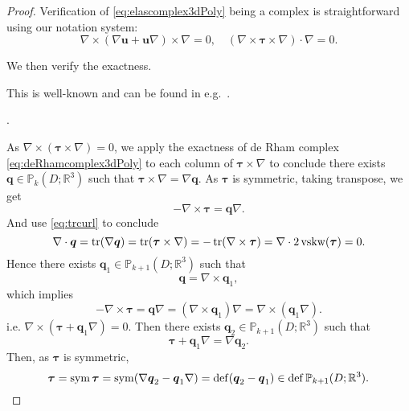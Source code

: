 \begin{proof}
Verification of \eqref{eq:elascomplex3dPoly} being a complex is straightforward using our notation system:
$$
\nabla \times (\nabla \boldsymbol  u + \boldsymbol  u\nabla)\times \nabla = 0, \quad (\nabla \times \boldsymbol  \tau\times \nabla)\cdot\nabla = 0.
$$


We then verify the exactness. 

\medskip
{} This is well-known and can be found in e.g.~\cite{Ciarlet:2010inequality}. 

\medskip

. 

As $\nabla \times (\boldsymbol  \tau \times \nabla) = 0$, we apply the exactness of de Rham complex \eqref{eq:deRhamcomplex3dPoly} to each column of $\boldsymbol  \tau \times \nabla$ to conclude there exists $\boldsymbol q\in\mathbb P_{k}(D;\mathbb R^3)$ such that $
\boldsymbol  \tau \times \nabla=\nabla\boldsymbol q.$ As $\boldsymbol  \tau$ is symmetric, taking transpose, we get
$$
 - \nabla \times \boldsymbol  \tau = \boldsymbol  q\nabla. 
$$
And use \eqref{eq:trcurl} to conclude
$$
\nabla\cdot \boldsymbol  q = \operatorname*{tr} (\nabla \boldsymbol  q) =\operatorname*{tr} ( \boldsymbol  \tau \times \nabla) = - \operatorname*{tr} (\nabla \times \boldsymbol  \tau) = \nabla \cdot 2\operatorname{vskw}(\boldsymbol  \tau) = 0.
$$
Hence there exists $\boldsymbol q_1\in\mathbb P_{k+1}(D;\mathbb R^3)$ such that
\[
\boldsymbol q=\nabla \times \boldsymbol q_1,
\]
which implies
\[
-\nabla \times \boldsymbol  \tau = \boldsymbol  q \nabla =  (\nabla \times \boldsymbol  q_1) \nabla = \nabla \times ( \boldsymbol  q_1 \nabla). 
\]
i.e. $\nabla \times (\boldsymbol \tau + \boldsymbol q_1\nabla)=0$. Then there exists $\boldsymbol q_2\in\mathbb P_{k+1}(D;\mathbb R^3)$ such that
\[
\boldsymbol \tau + \boldsymbol q_1 \nabla = \nabla\boldsymbol q_2.
\]
Then, as $\boldsymbol  \tau$ is symmetric,
$$\boldsymbol \tau=\operatorname{sym}\boldsymbol \tau=\operatorname{sym}(\nabla\boldsymbol q_2 - \boldsymbol q_1 \nabla )=\operatorname{def}(\boldsymbol q_2 - \boldsymbol q_1)\in\operatorname{def}\mathbb P_{k+1}(D;\mathbb R^3).$$


\end{proof}
